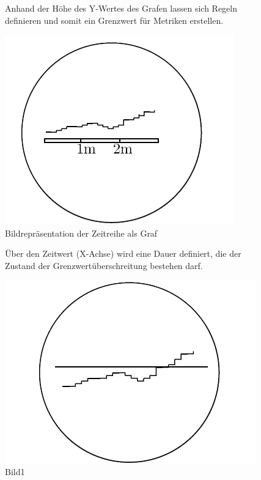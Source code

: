 \documentclass[a4paper,10pt]{scrartcl}
\begin{document}
\begin{figure}[htbp]
\begin{minipage}[t]{6cm}
\vspace{0pt}
Anhand der Höhe des Y-Wertes des Grafen lassen sich Regeln definieren und somit ein Grenzwert für Metriken erstellen.\\
\end{minipage}
\hfill
\begin{minipage}[t]{6cm}
\vspace{0pt}
\centering
  \includegraphics[scale=.3]{img/Datenaggregation/GrafZeitNew.png}
\caption{Bildrepräsentation der Zeitreihe als Graf}
\label{fig:Bild1}
\end{minipage}
\end{figure}

\begin{figure}[htbp]
\begin{minipage}[t]{6cm}
\vspace{0pt}
Über den Zeitwert (X-Achse) wird eine Dauer definiert, die der Zustand der Grenzwertüberschreitung bestehen darf.\\
\end{minipage}
\hfill
\begin{minipage}[t]{6cm}
\vspace{0pt}
\centering
  \includegraphics[scale=.3]{img/Datenaggregation/GrafYWertNew.png} 
\caption{Bild1}
\label{fig:Bild1}
\end{minipage}
\end{figure}
\end{document}

